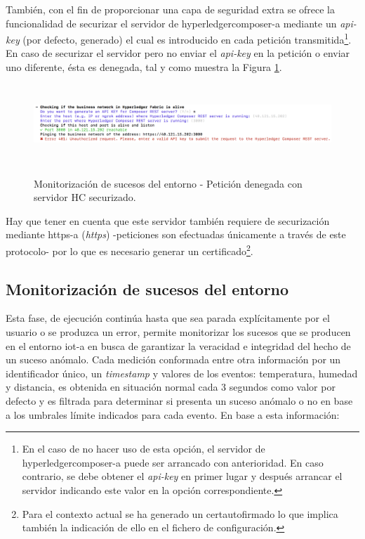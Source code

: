 \documentclass[12pt,a4paper, twoside]{report}
\begin{document}
\begin{itemize}
	 	 También, con el fin de proporcionar una capa de seguridad extra se ofrece la funcionalidad de securizar el servidor de \gls{hyperledgercomposer-a} mediante un \textit{api-key} (por defecto, generado) el cual es introducido en cada petición transmitida\footnote{En el caso de no hacer uso de esta opción, el servidor de \gls{hyperledgercomposer-a} puede ser arrancado con anterioridad. En caso contrario, se debe obtener el \textit{api-key} en primer lugar y después arrancar el servidor indicando este valor en la opción correspondiente.}. En caso de securizar el servidor pero no enviar el \textit{api-key} en la petición o enviar uno diferente, ésta es denegada, tal y como muestra la Figura \ref{fig:userguide_monitoring_hcUnauthorized}. \\
	 		
	 		\newpage
	 			 	 
	 		\begin{figure}[!ht]   
				\caption{Monitorización de sucesos del entorno - Petición denegada con servidor HC securizado.} 
				\begin{center} 
					\includegraphics[width=17cm,height=3cm]{Images/userGuide/monitoring/hcUnauthorized} \\
					\label{fig:userguide_monitoring_hcUnauthorized} 
				\end{center}  
			\end{figure}	 
			
			Hay que tener en cuenta que este servidor también requiere de securización mediante \gls{https-a} (\textit{\gls{https}}) -peticiones son efectuadas únicamente a través de este protocolo- por lo que es necesario generar un certificado\footnote{Para el contexto actual se ha generado un \gls{certautofirmado} lo que implica también la indicación de ello en el fichero de configuración.}.	 	
	 \end{itemize}
	 	 
	 \subsection{Monitorización de sucesos del entorno}
	 
	 Esta fase, de ejecución continúa hasta que sea parada explícitamente por el usuario o se produzca un error, permite monitorizar los sucesos que se producen en el entorno \gls{iot-a} en busca de garantizar la veracidad e integridad del hecho de un suceso anómalo. Cada medición conformada entre otra información por un identificador único, un \textit{timestamp} y valores de los eventos: temperatura, humedad y distancia, es obtenida en situación normal cada 3 segundos como valor por defecto y es filtrada para determinar si presenta un suceso anómalo o no en base a los umbrales límite indicados para cada evento. En base a esta información:
	 
\end{document}
